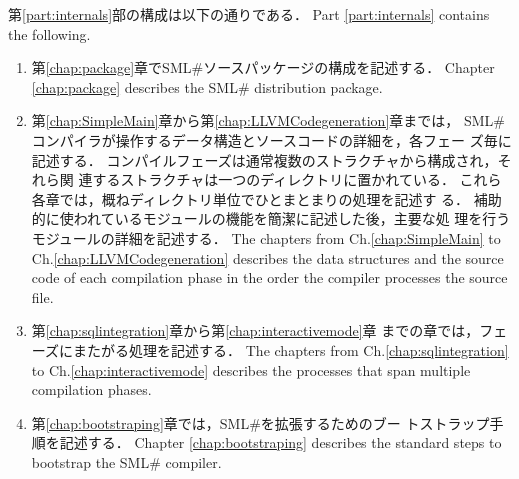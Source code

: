 \documentclass{jbook}
\newcommand{\smlsharp}{SML\#}
\begin{document}
\ifjp%
	第\ref{part:internals}部の構成は以下の通りである．
\else%
	Part \ref{part:internals} contains the following.
\fi%
\begin{enumerate}
\item 
\ifjp%
第\ref{chap:package}章で\smlsharp{}ソースパッケージの構成を記述する．
\else%
Chapter \ref{chap:package} describes the \smlsharp{} distribution package.
\fi%

\ifinternal

\item 
\ifjp%
      第\ref{chap:SimpleMain}章から第\ref{chap:LLVMCodegeneration}章までは，
\smlsharp{}コンパイラが操作するデータ構造とソースコードの詳細を，各フェー
ズ毎に記述する．
	コンパイルフェーズは通常複数のストラクチャから構成され，それら関
連するストラクチャは一つのディレクトリに置かれている．
	これら各章では，概ねディレクトリ単位でひとまとまりの処理を記述す
る． 
	補助的に使われているモジュールの機能を簡潔に記述した後，主要な処
理を行うモジュールの詳細を記述する．
\else%
      The chapters from Ch.\ref{chap:SimpleMain} to
Ch.\ref{chap:LLVMCodegeneration} describes the data structures and the
source code of each compilation phase in the order the compiler
processes  the source file.
\fi%

\item 
\ifjp%
	第\ref{chap:sqlintegration}章から第\ref{chap:interactivemode}章
までの章では，フェーズにまたがる処理を記述する．
\else%
	The chapters from Ch.\ref{chap:sqlintegration} to
Ch.\ref{chap:interactivemode} describes the processes that span
multiple compilation phases.
\fi%

\item 
\ifjp%
	第\ref{chap:bootstraping}章では，\smlsharp{}を拡張するためのブー
トストラップ手順を記述する．
\else%
	Chapter \ref{chap:bootstraping} describes the standard steps to
bootstrap the \smlsharp{} compiler. 
\fi%


\end{enumerate}
\end{document}
